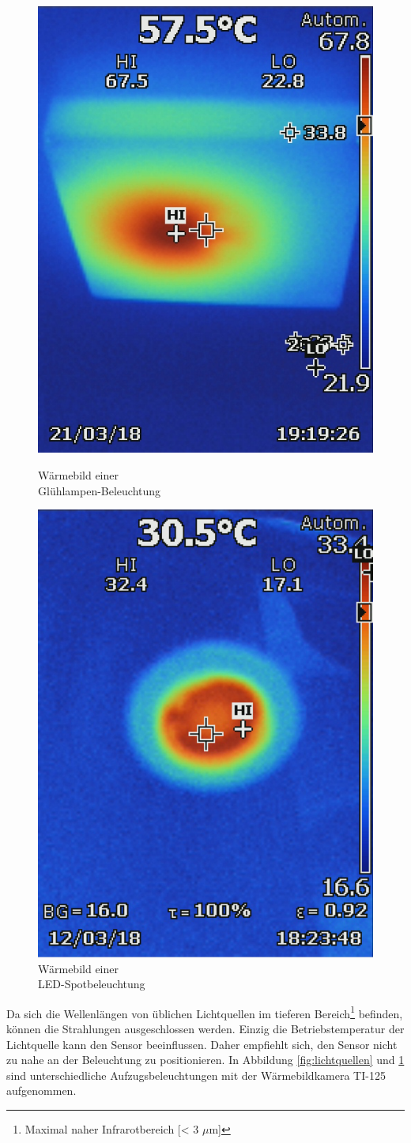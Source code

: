 \begin{figure}[!ht]
	\centering
	\begin{minipage}[b]{0.49\linewidth}
	\centering
	\includegraphics[width=0.5\linewidth]{fig/Lichtquellen.jpg}
	\caption{Wärmebild einer\\ Glühlampen-Beleuchtung}
	\label{fig:lichtquellen}
	\end{minipage}
	\hfill
	\begin{minipage}[b]{0.49\linewidth}
	\centering
	\includegraphics[width=0.5\linewidth]{fig/Lichtquelle.png}
	\caption{Wärmebild einer\\ LED-Spotbeleuchtung}
	\label{fig:m2lichtquelle}
	\end{minipage}
\end{figure}

Da sich die Wellenlängen von üblichen Lichtquellen im tieferen Bereich\footnote[12]{Maximal naher Infrarotbereich [< 3 $\mu$m]} befinden, können die Strahlungen ausgeschlossen werden. Einzig die Betriebstemperatur der Lichtquelle kann den Sensor beeinflussen. Daher empfiehlt sich, den Sensor nicht zu nahe an der Beleuchtung zu positionieren. In Abbildung \ref{fig:lichtquellen}  und \ref{fig:m2lichtquelle} sind unterschiedliche Aufzugsbeleuchtungen mit der Wärmebildkamera TI-125 aufgenommen.




